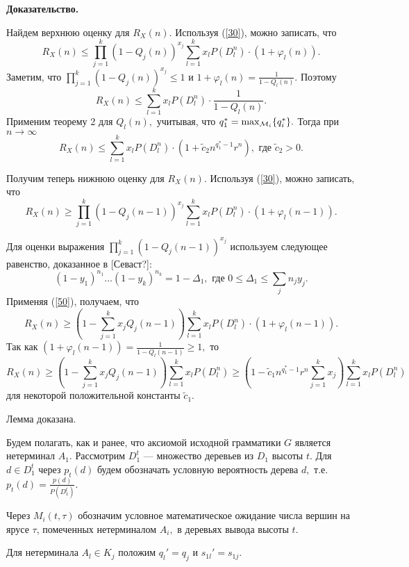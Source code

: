 \documentclass[12pt,russian]{article}
\begin{document}
{{\bf Доказательство.}

Найдем верхнюю оценку для $R_X(n).$
Используя (\ref{30}), можно записать, что
$$
R_X(n)\le
\prod_{j=1}^k \left(1-Q_j(n) \right)^{x_j}
\sum_{l=1}^k x_l P(D_l^{n})\cdot (1+\varphi_l(n)).
$$
Заметим, что $\prod_{j=1}^k \left(1-Q_j(n) \right)^{x_j}\le 1$
и $1+\varphi_l(n)=\frac{1}{1-Q_l(n)}.$
Поэтому
$$
R_X(n)\le
\sum_{l=1}^k x_l P(D_l^{n})\cdot \frac{1}{1-Q_l(n)}.
$$
Применим теорему 2 для $Q_l(n),$ учитывая, что $q^{*}_1 =\max_{{\cal M}_i}\{ q^{*}_i\}.$
Тогда при $n \rightarrow \infty$
$$
R_X(n)\le \sum_{l=1}^k x_l P(D_l^{n})\cdot
(1+\tilde{c}_2 n^{q^{*}_1-1 } r^n )
, \,\, \mbox{где}\, \, \tilde{c}_2>0.
$$

Получим теперь нижнюю оценку для $R_X(n).$ Используя (\ref{30}), можно записать, что
$$
R_X(n)\ge
\prod_{j=1}^k \left(1-Q_j(n-1)\right)^{x_j}
\sum_{l=1}^k x_l P(D_l^{n})\cdot (1+\varphi_l(n-1)).
$$

Для оценки выражения
$\prod_{j=1}^k \left(1-Q_j(n-1) \right)^{x_j} $
используем следующее равенство, доказанное в [Севаст?]:
\begin{equation}
(1-y_1)^{n_1} \ldots (1-y_k)^{n_k}=
1- \Delta_1, \,\,
\mbox{где} \,\, 0 \le \Delta_1 \le \sum_{j}n_j y_j .
\label{50}
\end{equation}
Применяя (\ref{50}), получаем, что
$$
R_X(n)\ge
\left(1-\sum_{j=1}^k x_j Q_j(n-1) \right)
\sum_{l=1}^k x_l P(D_l^{n})\cdot \left(1+\varphi_l(n-1)\right).
$$
Так как $\left(1+\varphi_l(n-1)\right)
=\frac{1}{1-Q_l(n-1)} \ge 1,$ то
$$
R_X(n)\ge
\left(1-\sum_{j=1}^k x_j Q_j(n-1) \right) \sum_{l=1}^k x_l P(D_l^{n}) \ge
\left(1-\tilde{c}_1 n^{q^{*}_1-1} r^{n}\sum_{j=1}^k x_j\right) \sum_{l=1}^k x_l P(D_l^{n})
$$
для некоторой положительной константы $\tilde{c}_1.$

Лемма доказана.

\nopagebreak
\medskip

Будем полагать, как и ранее, что аксиомой исходной грамматики $G$
является нетерминал $A_1.$
Рассмотрим $D^t_1$ --- множество деревьев из $D_1$ высоты $t.$
Для $d \in D_1^t$ через $p_t(d)$ будем обозначать условную вероятность дерева $d,$ т.е. $p_t(d)=\frac{p(d)}{P(D_1^t)}.$

\medskip

Через $M_i(t,\tau)$ обозначим условное математическое ожидание числа вершин
на ярусе $\tau$, помеченных нетерминалом $A_i,$ в деревьях вывода высоты $t.$

Для нетерминала $A_l \in K_j$ положим $q_l'=q_j$ и $s_{1l}'=s_{1j}.$

}
\end{document}
